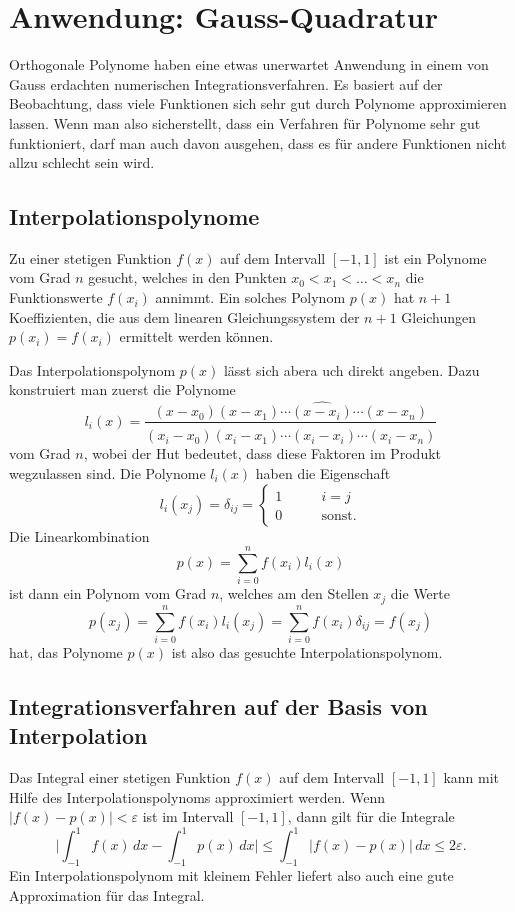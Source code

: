 %
%
\section{Anwendung: Gauss-Quadratur
\label{buch:orthogonal:section:gauss-quadratur}}
Orthogonale Polynome haben eine etwas unerwartet Anwendung in einem
von Gauss erdachten numerischen Integrationsverfahren.
Es basiert auf der Beobachtung, dass viele Funktionen sich sehr
gut durch Polynome approximieren lassen.
Wenn man also sicherstellt, dass ein Verfahren für Polynome
sehr gut funktioniert, darf man auch davon ausgehen, dass es für
andere Funktionen nicht allzu schlecht sein wird.

\subsection{Interpolationspolynome}
Zu einer stetigen Funktion $f(x)$ auf dem Intervall $[-1,1]$ 
ist ein Polynome vom Grad $n$ gesucht, welches in den Punkten
$x_0<x_1<\dots<x_n$ die Funktionswerte $f(x_i)$ annimmt.
Ein solches Polynom $p(x)$ hat $n+1$ Koeffizienten, die aus dem
linearen Gleichungssystem der $n+1$ Gleichungen $p(x_i)=f(x_i)$ 
ermittelt werden können.

Das Interpolationspolynom $p(x)$ lässt sich abera uch direkt 
angeben.
Dazu konstruiert man zuerst die Polynome
\[
l_i(x)
=
\frac{
(x-x_0)(x-x_1)\cdots\widehat{(x-x_i)}\cdots (x-x_n)
}{
(x_i-x_0)(x_i-x_1)\cdots\widehat{(x_i-x_i)}\cdots (x_i-x_n)
}
\]
vom Grad $n$, wobei der Hut bedeutet, dass diese Faktoren
im Produkt wegzulassen sind.
Die Polynome $l_i(x)$ haben die Eigenschaft
\[
l_i(x_j) = \delta_{ij}
=
\begin{cases}
1&\qquad i=j\\
0&\qquad\text{sonst}.
\end{cases}
\]
Die Linearkombination
\[
p(x) = \sum_{i=0}^n f(x_i)l_i(x)
\]
ist dann ein Polynom vom Grad $n$, welches am den Stellen $x_j$
die Werte
\[
p(x_j) 
=
\sum_{i=0}^n f(x_i)l_i(x_j)
=
\sum_{i=0}^n f(x_i)\delta_{ij}
=
f(x_j)
\]
hat, das Polynome $p(x)$ ist also das gesuchte Interpolationspolynom.

\subsection{Integrationsverfahren auf der Basis von Interpolation}
Das Integral einer stetigen Funktion $f(x)$ auf dem Intervall $[-1,1]$
kann mit Hilfe des Interpolationspolynoms approximiert werden.
Wenn $|f(x)-p(x)|<\varepsilon$ ist im Intervall $[-1,1]$, dann gilt
für die Integrale
\[
\biggl|\int_{-1}^1 f(x)\,dx -\int_{-1}^1p(x)\,dx\biggr|
\le
\int_{-1}^1 |f(x)-p(x)|\,dx
\le
2\varepsilon.
\]
Ein Interpolationspolynom mit kleinem Fehler liefert also auch
eine gute Approximation für das Integral.

